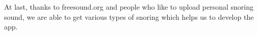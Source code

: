 \documentclass[conference]{IEEEtran}
\begin{document}
At last, thanks to freesound.org and people who like to upload personal snoring sound, we are able to get various types of snoring which helps us to develop the app.







%
%
% 




\end{document}
